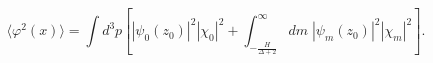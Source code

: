 \begin{equation}
\langle \varphi^{2}(x) \rangle = 
\int d^{3}p \left[ |\psi_{0}(z_0)|^{2} |\chi_{0}|^{2}
+ \int^{\infty}_{-\frac{H}{\Delta + 2}} dm \; |\psi_{m}(z_0)|^{2} |\chi_{m}|^{2} \right].
\end{equation}


